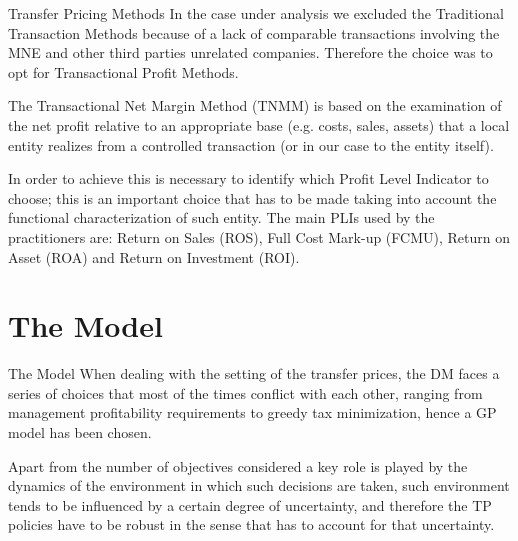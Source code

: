 \documentclass[10pt]{beamer}
\begin{document}
\begin{frame}{Transfer Pricing Methods}
  In the case under analysis we excluded the Traditional Transaction Methods because of a lack of comparable transactions involving the MNE and other third parties unrelated companies. Therefore the choice was to opt for Transactional Profit Methods.

  The Transactional Net Margin Method (TNMM) is based on the examination of the net profit relative to an appropriate base (e.g. costs, sales, assets) that a local entity realizes from a controlled transaction (or in our case to the entity itself).

  In order to achieve this is necessary to identify which Profit Level Indicator to choose; this is an important choice that has to be made taking into account the functional characterization of such entity. The main PLIs used by the practitioners are: Return on Sales (ROS), Full Cost Mark-up (FCMU), Return on Asset (ROA) and Return on Investment (ROI).
\end{frame}

\section{The Model}

\begin{frame}{The Model}
  When dealing with the setting of the transfer prices, the DM faces a series of choices that most of the times conflict with each other, ranging from management profitability requirements to greedy tax minimization, hence a GP model has been chosen.

  Apart from the number of objectives considered a key role is played by the dynamics of the environment in which such decisions are taken, such environment tends to be influenced by a certain degree of uncertainty, and therefore the TP policies have to be robust in the sense that has to account for that uncertainty.
\end{frame}
\end{document}
